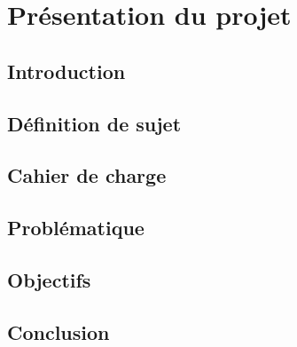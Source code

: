\chapter{Présentation du projet}

\section{Introduction}



\section{Définition de sujet}


\section{Cahier de charge}


\section{Problématique}


\section{Objectifs}


\section{Conclusion}